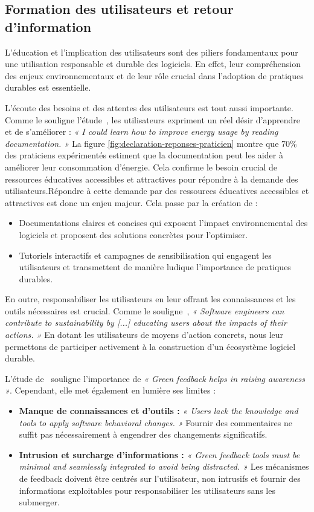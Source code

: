 \subsection{Formation des utilisateurs et retour d'information}
L'éducation et l'implication des utilisateurs sont des piliers fondamentaux pour une utilisation responsable et durable des logiciels. En effet, leur compréhension des enjeux environnementaux et de leur rôle crucial dans l'adoption de pratiques durables est essentielle.


L'écoute des besoins et des attentes des utilisateurs est tout aussi importante. Comme le souligne l'étude~\cite{EmpiricalStudy}, les utilisateurs expriment un réel désir d'apprendre et de s'améliorer : \emph{« I could learn how to improve energy usage by reading documentation. »} La figure \ref{fig:declaration-reponses-praticien} montre que 70\% des praticiens expérimentés estiment que la documentation peut les aider à améliorer leur consommation d'énergie. Cela confirme le besoin crucial de ressources éducatives accessibles et attractives pour répondre à la demande des utilisateurs.Répondre à cette demande par des ressources éducatives accessibles et attractives est donc un enjeu majeur. Cela passe par la création de :

\begin{itemize}
    \item Documentations claires et concises qui exposent l'impact environnemental des logiciels et proposent des solutions concrètes pour l'optimiser.
    \item Tutoriels interactifs et campagnes de sensibilisation qui engagent les utilisateurs et transmettent de manière ludique l'importance de pratiques durables.
\end{itemize}

En outre, responsabiliser les utilisateurs en leur offrant les connaissances et les outils nécessaires est crucial. Comme le souligne~\cite{SafetySecuritySustainability}, \emph{« Software engineers can contribute to sustainability by [...] educating users about the impacts of their actions. »} En dotant les utilisateurs de moyens d'action concrets, nous leur permettons de participer activement à la construction d'un écosystème logiciel durable.


L'étude de~\cite{ImpactGreenFeedback} souligne l'importance de \emph{« Green feedback helps in raising awareness »}. Cependant, elle met également en lumière ses limites :
\begin{itemize}
    \item \textbf{Manque de connaissances et d'outils :} \emph{« Users lack the knowledge and tools to apply software behavioral changes. »} Fournir des commentaires ne suffit pas nécessairement à engendrer des changements significatifs.
    \item \textbf{Intrusion et surcharge d'informations :} \emph{« Green feedback tools must be minimal and seamlessly integrated to avoid being distracted. »} Les mécanismes de feedback doivent être centrés sur l'utilisateur, non intrusifs et fournir des informations exploitables pour responsabiliser les utilisateurs sans les submerger.
\end{itemize}


